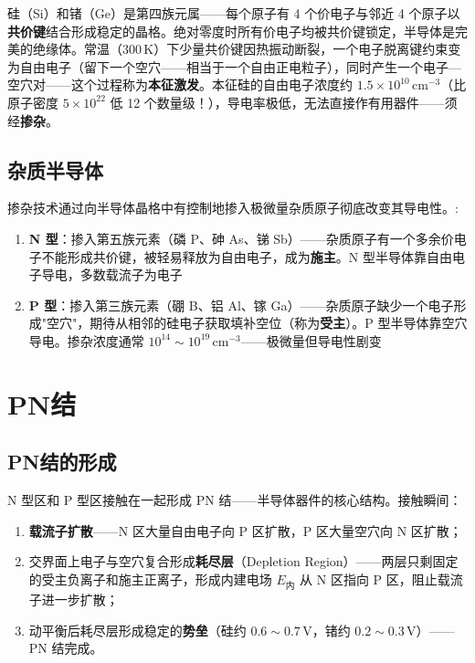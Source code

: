 \documentclass[12pt,UTF8]{ctexbook}
\begin{document}
硅（Si）和锗（Ge）是第四族元属——每个原子有 4 个价电子与邻近 4 个原子以\textbf{共价键}结合形成稳定的晶格。绝对零度时所有价电子均被共价键锁定，半导体是完美的绝缘体。常温（$300\,\mathrm{K}$）下少量共价键因热振动断裂，一个电子脱离键约束变为自由电子（留下一个空穴——相当于一个自由正电粒子），同时产生一个电子—空穴对——这个过程称为\textbf{本征激发}。本征硅的自由电子浓度约 $1.5\times10^{10}\,\mathrm{cm^{-3}}$（比原子密度 $5\times10^{22}$ 低 12 个数量级！），导电率极低，无法直接作有用器件——须经\textbf{掺杂}。

\subsection{杂质半导体}

掺杂技术通过向半导体晶格中有控制地掺入极微量杂质原子彻底改变其导电性。:
\begin{enumerate}
\item \textbf{N 型}：掺入第五族元素（磷 P、砷 As、锑 Sb）——杂质原子有一个多余价电子不能形成共价键，被轻易释放为自由电子，成为\textbf{施主}。N 型半导体靠自由电子导电，多数载流子为电子
\item \textbf{P 型}：掺入第三族元素（硼 B、铝 Al、镓 Ga）——杂质原子缺少一个电子形成"空穴"，期待从相邻的硅电子获取填补空位（称为\textbf{受主}）。P 型半导体靠空穴导电。掺杂浓度通常 $10^{14}\sim10^{19}\,\mathrm{cm^{-3}}$——极微量但导电性剧变
\end{enumerate}

\section{PN结}
\label{sec:pn_junction}

\subsection{PN结的形成}

N 型区和 P 型区接触在一起形成 PN 结——半导体器件的核心结构。接触瞬间：
\begin{enumerate}
\item \textbf{载流子扩散}——N 区大量自由电子向 P 区扩散，P 区大量空穴向 N 区扩散；
\item 交界面上电子与空穴复合形成\textbf{耗尽层}（Depletion Region）——两层只剩固定的受主负离子和施主正离子，形成内建电场 $E_{\text{内}}$ 从 N 区指向 P 区，阻止载流子进一步扩散；
\item 动平衡后耗尽层形成稳定的\textbf{势垒}（硅约 $0.6\sim0.7\,\mathrm{V}$，锗约 $0.2\sim0.3\,\mathrm{V}$）——PN 结完成。
\end{enumerate}
\end{document}
